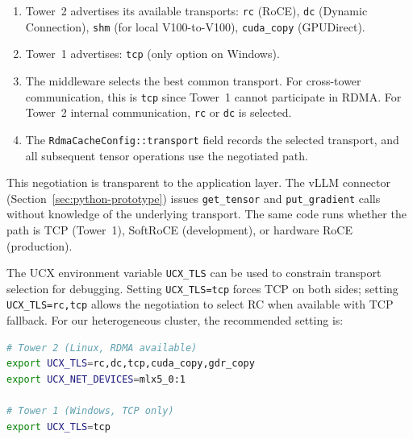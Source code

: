 \documentclass[11pt,letterpaper]{article}
\theoremstyle{definition}
\begin{document}
\begin{enumerate}
    \item Tower~2 advertises its available transports: \texttt{rc} (RoCE), \texttt{dc} (Dynamic Connection), \texttt{shm} (for local V100-to-V100), \texttt{cuda\_copy} (GPUDirect).
    \item Tower~1 advertises: \texttt{tcp} (only option on Windows).
    \item The middleware selects the best common transport. For cross-tower communication, this is \texttt{tcp} since Tower~1 cannot participate in RDMA. For Tower~2 internal communication, \texttt{rc} or \texttt{dc} is selected.
    \item The \texttt{RdmaCacheConfig::transport} field records the selected transport, and all subsequent tensor operations use the negotiated path.
\end{enumerate}

This negotiation is transparent to the application layer. The vLLM connector (Section~\ref{sec:python-prototype}) issues \texttt{get\_tensor} and \texttt{put\_gradient} calls without knowledge of the underlying transport. The same code runs whether the path is TCP (Tower~1), SoftRoCE (development), or hardware RoCE (production).

The UCX environment variable \texttt{UCX\_TLS} can be used to constrain transport selection for debugging. Setting \texttt{UCX\_TLS=tcp} forces TCP on both sides; setting \texttt{UCX\_TLS=rc,tcp} allows the negotiation to select RC when available with TCP fallback. For our heterogeneous cluster, the recommended setting is:
\begin{lstlisting}[language=bash]
# Tower 2 (Linux, RDMA available)
export UCX_TLS=rc,dc,tcp,cuda_copy,gdr_copy
export UCX_NET_DEVICES=mlx5_0:1

# Tower 1 (Windows, TCP only)
export UCX_TLS=tcp
\end{lstlisting}




\end{document}
